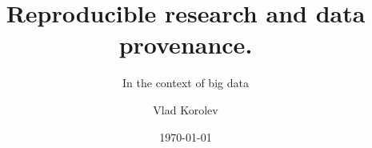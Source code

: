 \documentclass{beamer}
\title{Reproducible research and data provenance.}
\subtitle{In the context of big data}
\author{Vlad Korolev}
\date[]{ \today}
\begin{document}
{
\begin{frame}
  \titlepage
\end{frame}
}







\end{document}
